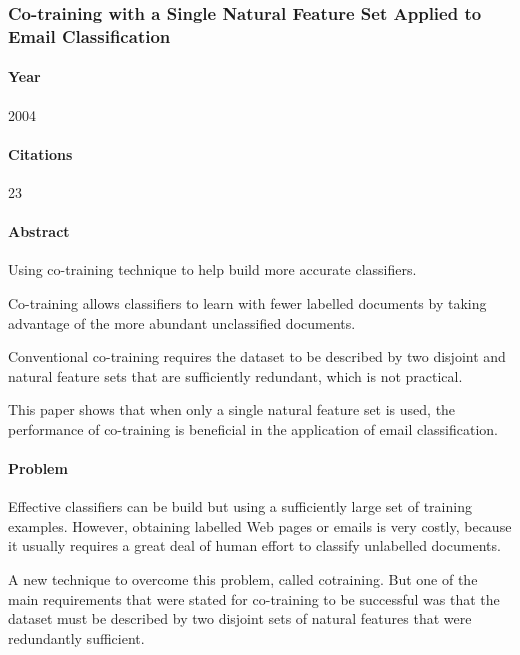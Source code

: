 \documentclass[12pt]{article}
\newenvironment{my_itemize}
{\begin{itemize}
  \setlength{\itemsep}{0cm}
  \setlength{\parskip}{0cm}}
{\end{itemize}}
\begin{document}

\subsubsection{Co-training with a Single Natural Feature Set Applied to Email Classification \cite{mous04}}

\paragraph{Year} 2004

\paragraph{Citations} 23

\paragraph{Abstract}
\begin{my_itemize}
 \item Using co-training technique to help build more accurate classifiers. 
 \item Co-training allows classifiers to learn with fewer labelled documents by taking advantage of the more abundant unclassified documents. 
 \item Conventional co-training requires the dataset to be described by two disjoint and natural feature sets that are sufficiently redundant, which is not practical.
 \item This paper shows that when only a single natural feature set is used, the performance of co-training is beneficial in the application of email classification.
\end{my_itemize}

\paragraph{Problem}
\begin{my_itemize}
 \item Effective classifiers can be build but using a sufficiently large set of training examples. However, obtaining labelled Web pages or emails is very costly, because it usually requires a great deal of human effort to classify unlabelled documents.
 \item A new technique to overcome this problem, called cotraining. But one of the main requirements that were stated for co-training to be successful was that the dataset must be described by two disjoint sets of natural features that were redundantly sufficient.
\end{my_itemize}
\end{document}
